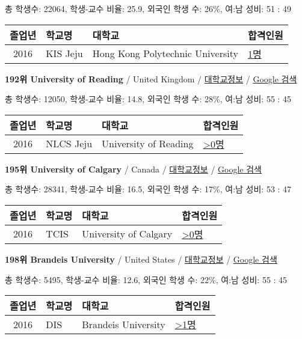 \documentclass[13pt,]{article}
\begin{document}
총 학생수: 22064, 학생-교수 비율: 25.9, 외국인 학생 수: 26\%, 여:남
성비: 51 : 49

\begin{longtable}[]{@{}clll@{}}
\toprule
졸업년 & 학교명 & 대학교 & 합격인원\tabularnewline
\midrule
\endhead
2016 & KIS Jeju & Hong Kong Polytechnic University &
\href{http://cafe.naver.com/assarabia/11596}{1명}\tabularnewline
\bottomrule
\end{longtable}

\textbf{192위 University of Reading} / United Kingdom /
\href{https://www.timeshighereducation.com/world-university-rankings/university-of-reading?ranking-dataset=589595}{대학교정보}
/ \href{http://www.google.com/search?q=University+of+Reading}{Google
검색}

총 학생수: 12050, 학생-교수 비율: 14.8, 외국인 학생 수: 28\%, 여:남
성비: 55 : 45

\begin{longtable}[]{@{}clll@{}}
\toprule
졸업년 & 학교명 & 대학교 & 합격인원\tabularnewline
\midrule
\endhead
2016 & NLCS Jeju & University of Reading &
\href{http://cafe.naver.com/assarabia/11592}{\textgreater{}0명}\tabularnewline
\bottomrule
\end{longtable}

\textbf{195위 University of Calgary} / Canada /
\href{https://www.timeshighereducation.com/world-university-rankings/university-of-calgary?ranking-dataset=589595}{대학교정보}
/ \href{http://www.google.com/search?q=University+of+Calgary}{Google
검색}

총 학생수: 28341, 학생-교수 비율: 16.5, 외국인 학생 수: 17\%, 여:남
성비: 53 : 47

\begin{longtable}[]{@{}clll@{}}
\toprule
졸업년 & 학교명 & 대학교 & 합격인원\tabularnewline
\midrule
\endhead
2016 & TCIS & University of Calgary &
\href{http://cafe.naver.com/assarabia/11598}{\textgreater{}0명}\tabularnewline
\bottomrule
\end{longtable}

\textbf{198위 Brandeis University} / United States /
\href{https://www.timeshighereducation.com/world-university-rankings/brandeis-university?ranking-dataset=589595}{대학교정보}
/ \href{http://www.google.com/search?q=Brandeis+University}{Google 검색}

총 학생수: 5495, 학생-교수 비율: 12.6, 외국인 학생 수: 22\%, 여:남 성비:
55 : 45

\begin{longtable}[]{@{}clll@{}}
\toprule
졸업년 & 학교명 & 대학교 & 합격인원\tabularnewline
\midrule
\endhead
2016 & DIS & Brandeis University &
\href{http://cafe.naver.com/assarabia/11591}{\textgreater{}1명}\tabularnewline
\bottomrule
\end{longtable}
\end{document}

